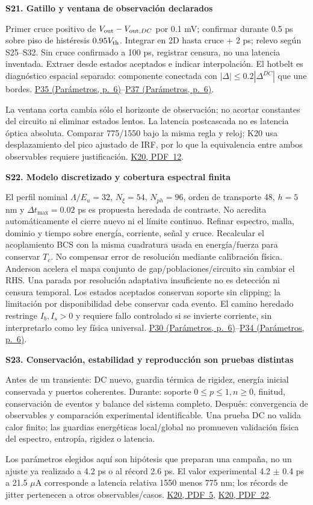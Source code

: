 \documentclass[11pt,a4paper]{article}
\newcommand{\block}[1]{\par\vspace{6pt}{\large\bfseries\color{ink}#1}\par\vspace{3pt}}
\newcommand{\K}[1]{\href{https://eprints.lancs.ac.uk/id/eprint/140252/3/Binder1.pdf\#page=#1}{K20, PDF~#1}}
\newcommand{\pref}[2]{\href{Parametros.pdf\#nameddest=#1}{#1 (Parámetros, p.~#2)}}
\newcommand{\assumption}[2]{\par\vspace{6pt}\hypertarget{#1}{\textbf{\color{ink}#1. #2}}\par}
\newcommand{\smallnote}[1]{{\small #1\par}}
\begin{document}
\block{Observación, cobertura numérica y trazabilidad}
\assumption{S21}{Gatillo y ventana de observación declarados}
\smallnote{Primer cruce positivo de $V_{\rm out}-V_{{\rm out},DC}$ por 0.1 mV; confirmar durante 0.5 ps sobre piso de histéresis $0.95V_{\rm th}$. Integrar en 2D hasta cruce + 2 ps; relevo según S25--S32. Sin cruce confirmado a 100 ps, registrar censura, no una latencia inventada. Extraer desde estados aceptados e indicar interpolación. El hotbelt es diagnóstico espacial separado: componente conectada con $|\Delta|\le0.2|\Delta^{DC}|$ que une bordes. \pref{P35}{6}--\pref{P37}{6}.}
\smallnote{La ventana corta cambia sólo el horizonte de observación; no acortar constantes del circuito ni eliminar estados lentos. La latencia postcascada no es latencia óptica absoluta. Comparar 775/1550 bajo la misma regla y reloj; K20 usa desplazamiento del pico ajustado de IRF, por lo que la equivalencia entre ambos observables requiere justificación. \K{12}.}
\assumption{S22}{Modelo discretizado y cobertura espectral finita}
\smallnote{El perfil nominal $\Lambda/E_u=32$, $N_\xi=54$, $N_{ph}=96$, orden de transporte 48, $h=5$ nm y $\Delta t_{\max}=0.02$ ps es propuesta heredada de contraste. No acredita automáticamente el cierre nuevo ni el límite continuo. Refinar espectro, malla, dominio y tiempo sobre energía, corriente, señal y cruce. Recalcular el acoplamiento BCS con la misma cuadratura usada en energía/fuerza para conservar $T_c$. No compensar error de resolución mediante calibración física. Anderson acelera el mapa conjunto de gap/poblaciones/circuito sin cambiar el RHS. Una parada por resolución adaptativa insuficiente no es detección ni censura temporal. Los estados aceptados conservan soporte sin clipping; la limitación por disponibilidad debe conservar cada evento. El camino heredado restringe $I_b,I_s>0$ y requiere fallo controlado si se invierte corriente, sin interpretarlo como ley física universal. \pref{P30}{6}--\pref{P34}{6}.}
\assumption{S23}{Conservación, estabilidad y reproducción son pruebas distintas}
\smallnote{Antes de un transiente: DC nuevo, guardia térmica de rigidez, energía inicial conservada y puertos coherentes. Durante: soporte $0\le p\le1,n\ge0$, finitud, conservación de eventos y balance del sistema completo. Después: convergencia de observables y comparación experimental identificable. Una prueba DC no valida calor finito; las guardias energéticas local/global no promueven validación física del espectro, entropía, rigidez o latencia.}
\smallnote{Los parámetros elegidos aquí son hipótesis que preparan una campaña, no un ajuste ya realizado a 4.2 ps o al récord 2.6 ps. El valor experimental 4.2 $\pm$ 0.4 ps a 21.5 $\mu$A corresponde a latencia relativa 1550 menos 775 nm; los récords de jitter pertenecen a otros observables/casos. \K{5}, \K{22}.}
\end{document}
